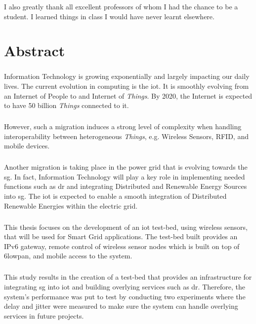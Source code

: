 \documentclass[oneside,12pt,a4paper,final]{book}
\begin{document}
\paragraph{}
I also greatly thank all excellent professors of whom I had the chance to be a student. I learned things in class  I would have never learnt elsewhere.


\chapter{Abstract}
\paragraph{}
Information Technology is growing exponentially and largely impacting our daily lives. The current evolution in computing is the \gls{iot}. It is smoothly evolving from an Internet of People to and Internet of \textit{Things}. By 2020, the Internet is expected to have 50 billion \textit{Things} connected to it. 
\paragraph{}
However, such a migration induces a strong level of complexity when handling interoperability between heterogeneous \textit{Things}, e.g. Wireless Sensors, RFID, and mobile devices.
\paragraph{}
Another migration is taking place in the power grid that is evolving towards the \gls{sg}. In fact, Information Technology will play a key role in implementing needed functions such as \gls{dr} and integrating Distributed and Renewable Energy Sources into \gls{sg}. The \gls{iot} is expected to enable a smooth integration of Distributed Renewable Energies within the electric grid.
\paragraph{}
This thesis focuses on the development of an \gls{iot} test-bed, using wireless sensors, that will be used for Smart Grid applications. The test-bed built provides an IPv6 gateway, remote control of wireless sensor nodes which is built on top of \gls{6lowpan}, and mobile access to the system.
\paragraph{}
This study results in the creation of a test-bed that provides an infrastructure for integrating \gls{sg} into \gls{iot} and building overlying services such as \gls{dr}. Therefore, the system's performance was put to test by conducting two experiments where the delay and jitter were measured to make sure the system can handle overlying services in future projects.
\end{document}
